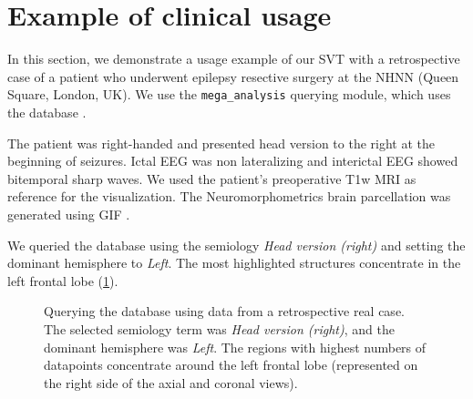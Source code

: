 \section{Example of clinical usage}


In this section, we demonstrate a usage example of our \ac{SVT} with a retrospective case of a patient who underwent epilepsy resective surgery at the \ac{NHNN} (Queen Square, London, UK).
We use the \texttt{mega\_analysis} querying module, which uses the \svtdatabase database \cite{alim-marvasti_mapping_2021,alim-marvasti_probabilistic_2021}.

The patient was right-handed and presented head version to the right at the beginning of seizures.
Ictal \ac{EEG} was non lateralizing and interictal \ac{EEG} showed bitemporal sharp waves.
We used the patient's preoperative \ac{T1w} \ac{MRI} as reference for the visualization.
The Neuromorphometrics brain parcellation was generated using \ac{GIF} \cite{cardoso_geodesic_2015}.

We queried the database using the semiology \textit{Head version (right)} and setting the dominant hemisphere to \textit{Left}.
The most highlighted structures concentrate in the left frontal lobe (\cref{fig:svt_case_heatmap}).

\begin{figure}
  \centering
  \caption[Querying the database using a retrospective real case]{
    Querying the database using data from a retrospective real case.
    The selected semiology term was \textit{Head version (right)}, and the dominant hemisphere was \textit{Left}.
    The regions with highest numbers of datapoints concentrate around the left frontal lobe (represented on the right side of the axial and coronal views).
  }
  \label{fig:svt_case_heatmap}
\end{figure}


